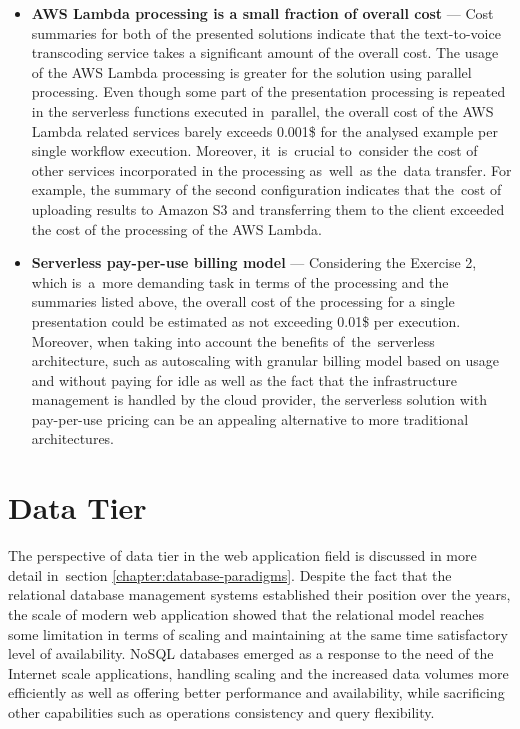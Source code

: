 \begin{itemize}
   \item \textbf{AWS Lambda processing is a small fraction of overall cost} --- Cost summaries for both of the presented solutions indicate that the text-to-voice transcoding service takes a significant amount of the overall cost.
   The usage of the AWS Lambda processing is greater for the solution using parallel processing.
   Even though some part of the presentation processing is repeated in the serverless functions executed in~parallel, the overall cost of the AWS Lambda related services barely exceeds 0.001\$ for the analysed example per single workflow execution.
   Moreover, it~is~crucial to~consider the cost of other services incorporated in the processing as~well~as the~data transfer.
   For example, the summary of the second configuration indicates that the~cost of uploading results to Amazon S3 and transferring them to the client exceeded the cost of the processing of the AWS Lambda.
   \item \textbf{Serverless pay-per-use billing model} --- Considering the Exercise 2, which is~a~more demanding task in terms of the processing and the summaries listed above, the overall cost of the processing for a single presentation could be estimated as not exceeding 0.01\$ per execution.
   Moreover, when taking into account the benefits of~the~serverless architecture, such as autoscaling with granular billing model based on usage and without paying for idle as well as the fact that the infrastructure management is handled by the cloud provider, the serverless solution with pay-per-use pricing can be an appealing alternative to more traditional architectures.
\end{itemize}

\newpage

\section{Data Tier} \label{chapter:serverless-datastores}

The perspective of data tier in the web application field is discussed in more detail in~section \ref{chapter:database-paradigms}.
Despite the fact that the relational database management systems established their position over the years, the scale of modern web application showed that the relational model reaches some limitation in terms of scaling and maintaining at the same time satisfactory level of availability.
NoSQL databases emerged as a response to the need of the Internet scale applications, handling scaling and the increased data volumes more efficiently as well as offering better performance and availability, while sacrificing other capabilities such as operations consistency and query flexibility.

